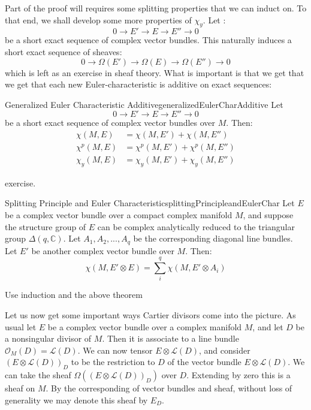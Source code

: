 \documentclass{book}
\newcommand{\C}{{\mathbb{C}}}
\newcommand{\CL}{{\mathcal{L}}}
\newcommand{\CO}{{\mathcal{O}}}
\begin{document}
Part of the proof will requires some splitting properties that we can induct on. To that end, we shall develop
some more properties of $\chi_y$. Let
:
\[
  0 \to E' \to E \to E'' \to 0
\]
be a short exact sequence of complex vector bundles. This naturally induces a short exact sequence of sheaves:
\[
  0 \to \Omega(E') \to \Omega(E) \to \Omega(E'') \to 0
\]
which is left as an exercise in sheaf theory. What is important is that we get that we get that each new
Euler-characteristic is additive on exact sequences:
\begin{thm}{Generalized Euler Characteristic Additive}{generalizedEulerCharAdditive}
  Let
  \[
    0 \to E' \to E \to E'' \to 0
  \]
  be a short exact sequence of complex vector bundles over $M$. Then:
  \begin{align*}
   \chi(M, E) &= \chi(M, E') + \chi(M, E'')\\
   \chi^p(M, E) &= \chi^p(M, E') + \chi^p(M, E'')\\
   \chi_y(M, E) &= \chi_y(M, E') + \chi_y(M, E'')
  \end{align*}
\end{thm}

\begin{Proof}
  exercise.
\end{Proof}

\begin{thm}{Splitting Principle and Euler Characteristic}{splittingPrincipleandEulerChar}
  Let  $E$ be a complex vector bundle over a compact complex manifold $M$, and suppose the structure group of
  $E$ can be complex analytically reduced to  the triangular group $\Delta(q, \C)$. Let $A_1, A_2, ..., A_q$
  be the corresponding diagonal line bundles. Let $E'$ be another complex vector bundle over $M$. Then:
  \[
    \chi(M, E'\otimes E) = \sum_i^q \chi(M, E'\otimes A_i)
  \]
\end{thm}

\begin{Proof}
  Use induction and the above theorem
\end{Proof}

Let us now get some important ways Cartier divisors come into the picture. As usual let $E$ be a complex
vector bundle over a complex manifold $M$, and let $D$ be a nonsingular divisor of $M$. Then it is associate
to a line bundle $\CO_M(D) = \CL(D)$. We can now tensor $E\otimes \CL(D)$, and consider $(E\otimes \CL(D))_D$
to be the restriction to $D$ of the vector bundle $E\otimes \CL(D)$. We can take the sheaf $\Omega((E\otimes
\CL(D))_D)$ over $D$. Extending by zero this is a sheaf on $M$. By the corresponding of vector bundles and
sheaf, without loss of generality we may denote this sheaf by $E_D$.
\end{document}
